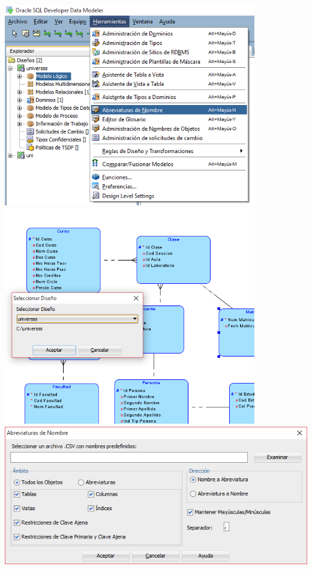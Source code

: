 \documentclass[a4paper,openright,12pt]{book}
\begin{document}
\begin{center}
\includegraphics[width=11cm]{./images/5-1 Ejercicio 2/1.png}\\
\includegraphics[width=11cm]{./images/5-1 Ejercicio 2/2.png}\\
\includegraphics[width=14cm]{./images/5-1 Ejercicio 2/3.png}\\

\end{center}
\end{document}

